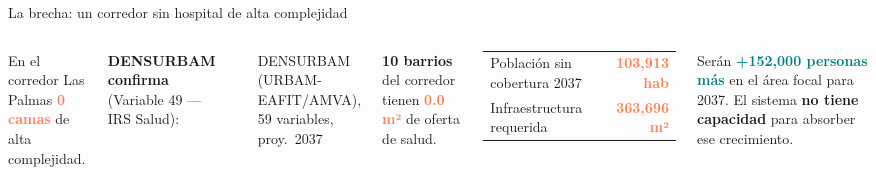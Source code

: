 \documentclass[aspectratio=169, 11pt]{beamer}
\newcommand{\highlight}[1]{\textcolor{teal}{\textbf{#1}}}
\newcommand{\danger}[1]{\textcolor{coral}{\textbf{#1}}}
\begin{document}
{\begin{frame}{La brecha: un corredor sin hospital de alta complejidad}
\begin{columns}[T]
\begin{block}{\small En el corredor Las Palmas}
\vspace{3pt}
\danger{0 camas} de alta complejidad.
\end{block}

\textbf{DENSURBAM confirma} (Variable 49 --- IRS Salud):

\vspace{4pt}
\begin{center}
\end{center}

\vspace{2pt}
{\scriptsize\textcolor{slate}{DENSURBAM (URBAM-EAFIT/AMVA), 59 variables, proy.\ 2037}}

\vspace{4pt}
\textbf{10 barrios} del corredor tienen \danger{0.0 m²} de oferta de salud.

\vspace{3pt}
{\footnotesize
\begin{tabular}{@{}lr@{}}
Población sin cobertura 2037 & \danger{103,913 hab} \\
Infraestructura requerida & \danger{363,696 m²} \\
\end{tabular}
}

\vspace{4pt}
{\footnotesize Serán \highlight{+152,000 personas más} en el área focal para 2037. El sistema \textbf{no tiene capacidad} para absorber ese crecimiento.}
\end{columns}
\end{frame}
}
\end{document}
